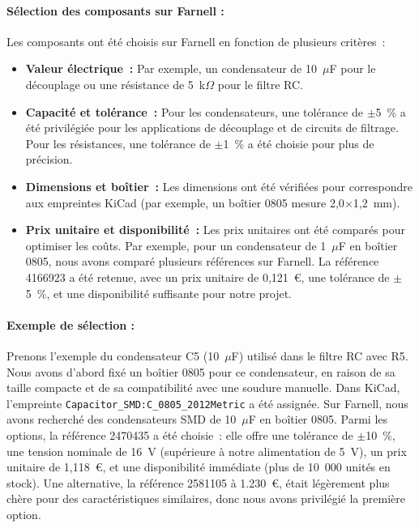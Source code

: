 \documentclass[12pt, a4paper, titlepage]{article}
\begin{document}
\paragraph{Sélection des composants sur Farnell :}

Les composants ont été choisis sur Farnell en fonction de plusieurs critères~:
\begin{itemize}
	\item \textbf{Valeur électrique~:} Par exemple, un condensateur de 10~$\mu$F pour le découplage ou une résistance de 5~k$\Omega$ pour le filtre RC.
	\item \textbf{Capacité et tolérance~:} Pour les condensateurs, une tolérance de $\pm$5~\% a été privilégiée pour les applications de découplage et de circuits de filtrage. Pour les résistances, une tolérance de $\pm$1~\% a été choisie pour plus de précision.
	\item \textbf{Dimensions et boîtier~:} Les dimensions ont été vérifiées pour correspondre aux empreintes KiCad (par exemple, un boîtier 0805 mesure 2,0$\times$1,2~mm).
	\item \textbf{Prix unitaire et disponibilité~:} Les prix unitaires ont été comparés pour optimiser les coûts. Par exemple, pour un condensateur de 1~$\mu$F en boîtier 0805, nous avons comparé plusieurs références sur Farnell. La référence 4166923 a été retenue, avec un prix unitaire de 0,121~€, une tolérance de $\pm$5~\%, et une disponibilité suffisante pour notre projet.
\end{itemize}

\paragraph{Exemple de sélection :}

Prenons l’exemple du condensateur C5 (10~$\mu$F) utilisé dans le filtre RC avec R5. Nous avons d’abord fixé un boîtier 0805 pour ce condensateur, en raison de sa taille compacte et de sa compatibilité avec une soudure manuelle. Dans KiCad, l’empreinte \texttt{Capacitor\_SMD:C\_0805\_2012Metric} a été assignée. Sur Farnell, nous avons recherché des condensateurs SMD de 10~$\mu$F en boîtier 0805. Parmi les options, la référence 2470435 a été choisie~: elle offre une tolérance de $\pm$10~\%, une tension nominale de 16~V (supérieure à notre alimentation de 5~V), un prix unitaire de 1,118~€, et une disponibilité immédiate (plus de 10~000 unités en stock). Une alternative, la référence 2581105 à 1.230~€, était légèrement plus chère pour des caractéristiques similaires, donc nous avons privilégié la première option.
\end{document}
